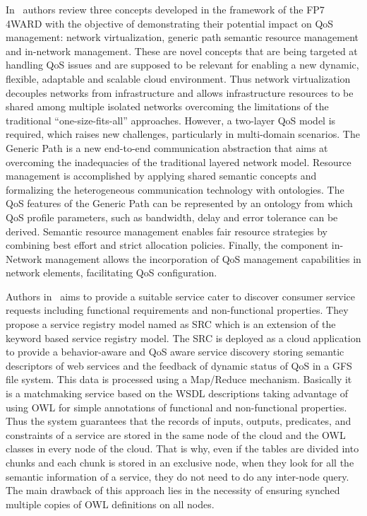 In~\cite{5682131} authors review three concepts developed in the framework of 
the FP7 4WARD with the objective of demonstrating their potential impact on QoS 
management: network virtualization, generic path semantic resource management 
and in-network management. These are novel concepts that are being targeted at 
handling QoS issues and are supposed to be relevant for enabling a new dynamic, 
flexible, adaptable and scalable cloud environment. Thus network virtualization 
decouples networks from infrastructure and allows infrastructure resources to be 
shared among multiple isolated networks overcoming the limitations of the 
traditional “one-size-fits-all” approaches. However, a two-layer QoS model is 
required, which raises new challenges, particularly in multi-domain scenarios. 
The Generic Path is a new end-to-end communication abstraction that aims at 
overcoming the inadequacies of the traditional layered network model. Resource 
management is accomplished by applying shared semantic concepts and formalizing 
the heterogeneous communication technology with ontologies. The QoS features of 
the Generic Path can be represented by an ontology from which QoS profile 
parameters, such as bandwidth, delay and error tolerance can be derived. 
Semantic resource management enables fair resource strategies by combining best 
effort and strict allocation policies. Finally, the component in-Network 
management allows the incorporation of QoS management capabilities in network 
elements, facilitating QoS configuration.

Authors in~\cite{DBLP:conf/soca/ChenL10} aims to provide a suitable service cater to discover consumer 
service requests including functional requirements and non-functional 
properties. They propose a service registry model named as SRC which is an 
extension of the keyword based service registry model. The SRC is deployed as a 
cloud application to provide a behavior-aware and QoS aware service discovery 
storing semantic descriptors of web services and the feedback of dynamic status 
of QoS in a GFS file system. This data is processed using a Map/Reduce 
mechanism. Basically it is a matchmaking service based on the WSDL descriptions 
taking advantage of using OWL for simple annotations of functional and 
non-functional properties. Thus the system guarantees that the records of 
inputs, outputs, predicates, and constraints of a service are stored in the same 
node of the cloud and the OWL classes in every node of the cloud. That is why, 
even if the tables are divided into chunks and each chunk is stored in an 
exclusive node, when they look for all the semantic information of a service, 
they do not need to do any inter-node query. The main drawback of this approach 
lies in the necessity of ensuring synched multiple copies of OWL definitions on 
all nodes.

